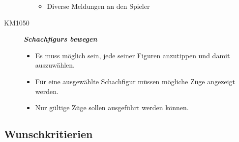 \documentclass[parskip=full]{scrartcl}
\begin{document}
\begin{description}
\begin{itemize}
\begin{itemize}
		\item Diverse Meldungen an den Spieler
	\end{itemize}
\end{itemize}
\item[KM1050] \textbf{\textit{\glspl{Schachfigur} bewegen}}
\begin{itemize}
	\item Es muss möglich sein, jede seiner Figuren anzutippen und damit auszuwählen.
	\item Für eine ausgewählte \gls{Schachfigur} müssen mögliche Züge angezeigt werden.
	\item Nur gültige Züge sollen ausgeführt werden können.
\end{itemize}
\end{description}

\subsection{Wunschkritierien}
\end{document}
